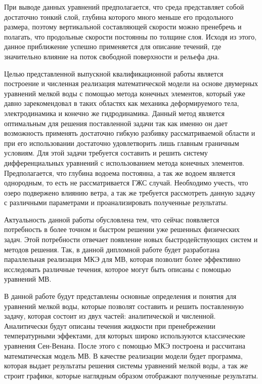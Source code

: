 \documentclass[14pt]{extreport}
\begin{document}
При выводе данных уравнений предполагается, что среда представляет собой достаточно тонкий слой, глубина которого много меньше его продольного размера, поэтому вертикальной составляющей скорости можно пренебречь и полагать, что продольные скорости постоянны по толщине слоя.  Исходя из этого, данное приближение успешно применяется для описание течений, где значительно влияние на поток свободной поверхности и рельефа дна. 

Целью представленной выпускной квалификационной работы является построение и численная реализация математической модели на основе двумерных уравнений мелкой воды с помощью метода конечных элементов, который уже давно зарекомендовал\cite{bib:fem:nory} в таких областях как механика деформируемого тела, электродинамика и конечно же гидродинамика. Данный метод является оптимальным для решения поставленной задачи так как именно он дает возможность применять достаточно гибкую разбивку рассматриваемой области и при его использовании достаточно удовлетворить лишь главным граничным условиям. Для этой задачи требуется составить и решить систему дифференциальных уравнений с использованием метода конечных элементов. Предполагается, что глубина водоема постоянна, а так же водоем является однородным, то есть не рассматривается ГЖС случай. Необходимо учесть, что озеро подвержено влиянию ветра, а так же требуется рассмотреть данную задачу с различными параметрами и проанализировать полученные результаты.

Актуальность данной работы обусловлена тем, что сейчас появляется потребность в более точном и быстром решении уже решенных физических задач. Этой потребности отвечает появление новых быстродействующих систем и методов решения. Так, в данной дипломной работе будет разработана параллельная реализация МКЭ для МВ, которая позволит более эффективно исследовать различные течения, которое могут быть описаны с помощью уравнений МВ.

В данной работе будут представлены основные определения и понятия для уравнений мелкой воды, которые позволят составить и решить поставленную задачу, которая состоит из двух частей: аналитической и численной. Аналитически будут описаны течения жидкости при пренебрежении температурными эффектами, для которых широко используются классические уравнения Сен-Венана. После этого с помощью МКЭ построена и рассчитана математическая модель МВ. В качестве реализации модели будет программа, которая выдает результаты решения системы уравнений мелкой воды, а так же строит графики, которые наглядным образом отображают полученные результаты.
\end{document}
